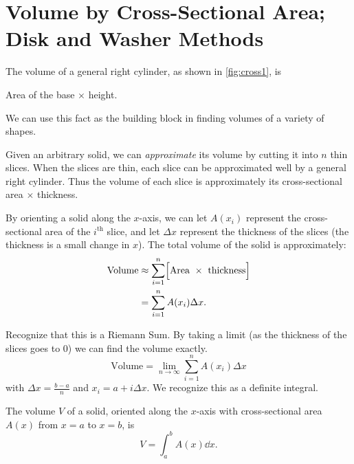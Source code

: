 \section[Volume by Cross-Sectional Area; Disk and Washer Methods]{Volume by Cross-Sectional Area;\\Disk and Washer Methods}\label{sec:disk}

The volume of a general right cylinder, as shown in \autoref{fig:cross1}, is 
\begin{center}
Area of the base $\times$ height.
\end{center}
We can use this fact as the building block in finding volumes of a variety of shapes.


Given an arbitrary solid, we can \emph{approximate} its volume by cutting it into $n$  thin slices. When the slices are thin, each slice can be approximated well by a general right cylinder. Thus the volume of each slice is approximately its cross-sectional area $\times$ thickness.

By orienting a solid along the $x$-axis, we can let $A(x_i)$ represent the cross-sectional area
of the $i^{\text{th}}$ slice, and let $\Delta x$ represent the thickness of the slices (the thickness is a small change in $x$). The total volume of the solid is approximately:
	\begin{align*} \text{Volume} &\approx \sum_{i=1}^n \Bigl[\text{Area}\ \times\ \text{thickness}\Bigr] \\
			&= \sum_{i=1}^n A(x_i)\Delta x.
	\end{align*}
	
Recognize that this is a Riemann Sum. By taking a limit (as the thickness of the slices goes to 0) we can find the volume exactly. 
\[\text{Volume}=\lim_{n\to \infty} \sum_{i=1}^n A(x_i)\Delta x\]
with $\Delta x=\frac{b-a}{n}$ and $x_i=a+i\Delta x$. We recognize this as a definite integral.

\begin{theorem}\label{thm:volume_by_cross_section}%
The volume $V$ of a solid, oriented along the $x$-axis with cross-sectional area $A(x)$ from $x=a$ to $x=b$, is 
\[V = \int_a^b A(x)\dd x.\]
\end{theorem}

